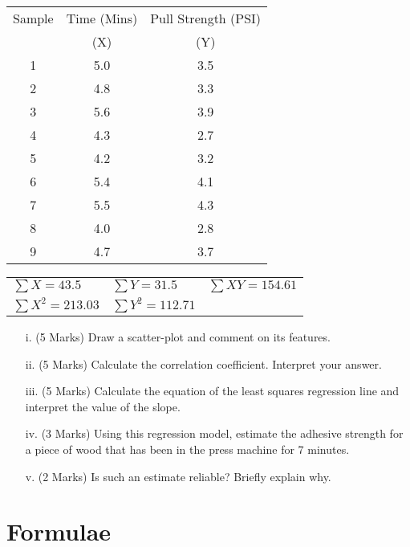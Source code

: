 \documentclass[a4paper,12pt]{article}
\begin{document}
\begin{center}
\begin{tabular}{|c|c|c|}

  \hline
Sample &Time (Mins) & Pull Strength (PSI) \\
 & (X)  &  (Y)\\ \hline
1& 5.0& 3.5 \\
2& 4.8& 3.3\\
3& 5.6& 3.9\\
4& 4.3& 2.7\\
5& 4.2& 3.2\\
6& 5.4& 4.1\\
7& 5.5& 4.3\\
8& 4.0& 2.8\\
9& 4.7& 3.7\\
  \hline
\end{tabular}
\bigskip

\begin{tabular}{lll}
  $\sum X = 43.5$ & $\sum Y = 31.5$ & $\sum XY = 154.61$ \\
  $\sum X^2 = 213.03$ & $\sum Y^2 = 112.71$ &  \\
 \end{tabular}
 \end{center}

\begin{itemize}
\item[i.](5 Marks) Draw a scatter-plot and comment on its features.
\item[ii.](5 Marks) Calculate the correlation coefficient. Interpret your answer.
\item[iii.](5 Marks) Calculate the equation of the least squares regression line and interpret the value of the slope.
\item[iv.](3 Marks) Using this regression model, estimate the adhesive strength for a piece of wood that has been in the press machine for 7 minutes.
\item[v.](2 Marks) Is such an estimate reliable? Briefly explain why.
\end{itemize}



\newpage
\section*{Formulae}
\end{document}
